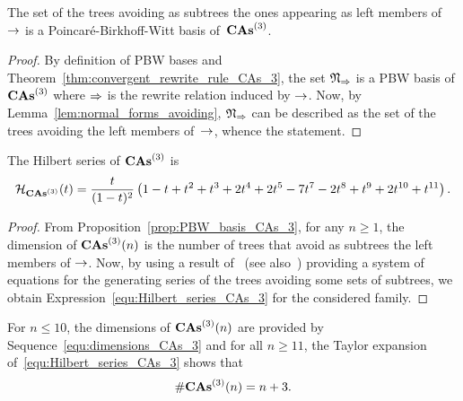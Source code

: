 \begin{Proposition} \label{prop:PBW_basis_CAs_3}
    The set of the trees avoiding as subtrees the ones appearing as
    left members of $\operatorname{\to}$ is a Poincaré-Birkhoff-Witt basis
    of~$\mathbf{CAs}^{\left(3\right)}$.
\end{Proposition}
\begin{proof}
    By definition of PBW bases and
    Theorem~\ref{thm:convergent_rewrite_rule_CAs_3}, the set
    $\mathfrak{N}_{\operatorname{\Rightarrow}}$ is a PBW basis of $\mathbf{CAs}^{\left(3\right)}$ where
    $\operatorname{\Rightarrow}$ is the rewrite relation induced by $\operatorname{\to}$. Now, by
    Lemma~\ref{lem:normal_forms_avoiding}, $\mathfrak{N}_{\operatorname{\Rightarrow}}$
    can be described as the set of the trees avoiding the left members
    of~$\operatorname{\to}$, whence the statement.
\end{proof}
\medbreak

\begin{Proposition} \label{prop:Hilbert_series_CAs_3}
    The Hilbert series of $\mathbf{CAs}^{\left(3\right)}$ is
    \begin{equation} \label{equ:Hilbert_series_CAs_3}
        \mathcal{H}_{\mathbf{CAs}^{\left(3\right)}}(t) = \frac{t}{(1 - t)^2}
        \left(1 - t + t^2 + t^3 + 2t^4 + 2t^5 - 7t^7 - 2t^8 + t^9 +
        2t^{10} + t^{11}\right).
    \end{equation}
\end{Proposition}
\begin{proof}
    From Proposition~\ref{prop:PBW_basis_CAs_3}, for any $n \geq 1$, the
    dimension of $\mathbf{CAs}^{\left(3\right)}(n)$ is the number of trees that avoid as
    subtrees the left members of $\operatorname{\to}$. Now, by using a result
    of~\cite{Gir18} (see also~\cite{Row10,KP15}) providing a system of
    equations for the generating series of the trees avoiding some sets
    of subtrees, we obtain Expression~\eqref{equ:Hilbert_series_CAs_3}
    for the considered family.
\end{proof}
\medbreak

For $n \leq 10$, the dimensions of $\mathbf{CAs}^{\left(3\right)}(n)$ are provided by
Sequence~\eqref{equ:dimensions_CAs_3} and for all $n \geq 11$, the
Taylor expansion of~\eqref{equ:Hilbert_series_CAs_3} shows that
\begin{equation}
  \# \mathbf{CAs}^{\left(3\right)}(n) = n + 3.
  \end{equation}
\medbreak

